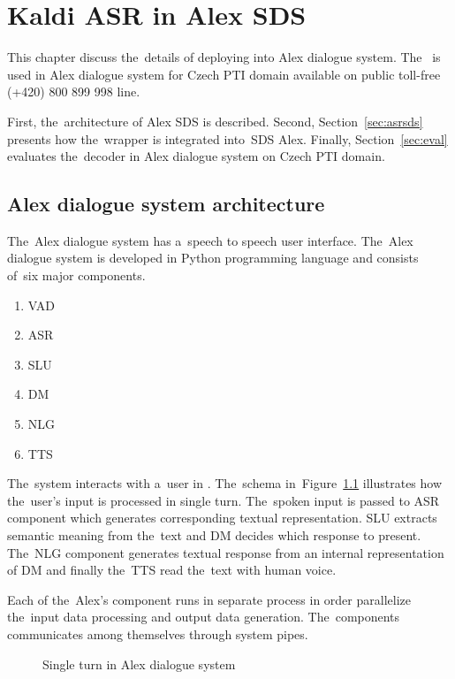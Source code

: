\chapter{Kaldi \acs{ASR} in Alex \acs{SDS}}
\label{cha:integration}

This chapter discuss the~details of deploying  into Alex dialogue system.
The~ is used in Alex dialogue system for Czech \acf{PTI} domain available on public toll-free (+420) 800 899 998 line.

First, the~architecture of Alex \acf{SDS} is described.
Second, Section~\ref{sec:asrsds} presents how the~wrapper  is integrated into~\ac{SDS} Alex.
Finally, Section~\ref{sec:eval} evaluates the~decoder in Alex dialogue system on Czech \ac{PTI} domain. 

\section{Alex dialogue system architecture} 
\label{sec:arch}

The~Alex dialogue system has a~speech to speech user interface. 
The~Alex dialogue system is developed in Python programming language and consists of~six major components. 
\begin{enumerate}
    \item \acf{VAD} 
    \item \acf{ASR}
    \item \acf{SLU}
    \item \acf{DM}
    \item \acf{NLG}
    \item \acf{TTS}
\end{enumerate}
The~system interacts with a~user in . 
The~schema in~Figure~\ref{fig:alex} illustrates how the~user's input is processed in single turn.
The~spoken input is passed to \ac{ASR} component which generates corresponding textual representation.
\ac{SLU} extracts semantic meaning from the~text and \ac{DM} decides which response to present.
The~\ac{NLG} component generates textual response from an internal representation of \ac{DM} and finally the~\ac{TTS} read the~text with human voice.

Each of the~Alex's component runs in separate process in order parallelize the~input data processing and output data generation.
The~components communicates among themselves through system pipes.

\begin{figure}
    \begin{center}
    
    \caption{Single turn in Alex dialogue system}
    \label{fig:alex} 
    \end{center}
\end{figure}

